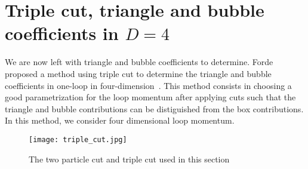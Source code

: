 \section{Triple cut, triangle and bubble coefficients in $D=4$}\label{sect-triple_cut}
We are now left with triangle and bubble coefficients to determine. 
Forde proposed a method using triple cut to determine the triangle and bubble coefficients in one-loop in four-dimension~\cite{Forde:2007mi}.
This method consists in choosing a good parametrization for the loop momentum after applying cuts such that the triangle and bubble contributions can be distiguished from the box contributions.
In this method, we consider four dimensional loop momentum.
\begin{figure}[h]
  \centering
  \texttt{[image: triple\_cut.jpg]}
  \caption{The two particle cut and triple cut used in this section}
  \label{fig-triple_cut}
\end{figure}
%

